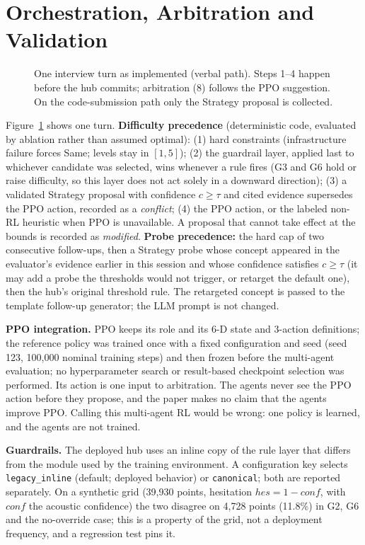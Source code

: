 \section{Orchestration, Arbitration and Validation}\label{sec:arbitration}
\begin{figure}[tbp]
\centering
\resizebox{0.68\textwidth}{!}{}
\caption{One interview turn as implemented (verbal path). Steps 1--4 happen before the hub commits; arbitration (8) follows the PPO suggestion. On the code-submission path only the Strategy proposal is collected.}\label{fig:flow}
\end{figure}
Figure~\ref{fig:flow} shows one turn. \textbf{Difficulty precedence} (deterministic code, evaluated by ablation rather than assumed optimal): (1) hard constraints (infrastructure failure forces Same; levels stay in $[1,5]$); (2) the guardrail layer, applied last to whichever candidate was selected, wins whenever a rule fires (G3 and G6 hold or raise difficulty, so this layer does not act solely in a downward direction); (3) a validated Strategy proposal with confidence $c \ge \tau$ and cited evidence supersedes the PPO action, recorded as a \emph{conflict}; (4) the PPO action, or the labeled non-RL heuristic when PPO is unavailable. A proposal that cannot take effect at the bounds is recorded as \emph{modified}. \textbf{Probe precedence:} the hard cap of two consecutive follow-ups, then a Strategy probe whose concept appeared in the evaluator's evidence earlier in this session and whose confidence satisfies $c \ge \tau$ (it may add a probe the thresholds would not trigger, or retarget the default one), then the hub's original threshold rule. The retargeted concept is passed to the template follow-up generator; the LLM prompt is not changed.

\textbf{PPO integration.} PPO keeps its role and its 6-D state and 3-action definitions; the reference policy was trained once with a fixed configuration and seed (seed 123, 100,000 nominal training steps) and then frozen before the multi-agent evaluation; no hyperparameter search or result-based checkpoint selection was performed. Its action is one input to arbitration. The agents never see the PPO action before they propose, and the paper makes no claim that the agents improve PPO. Calling this multi-agent RL would be wrong: one policy is learned, and the agents are not trained.

\textbf{Guardrails.} The deployed hub uses an inline copy of the rule layer that differs from the module used by the training environment. A configuration key selects \texttt{legacy\_inline} (default; deployed behavior) or \texttt{canonical}; both are reported separately. On a synthetic grid (39,930 points, hesitation $\mathit{hes}=1-\mathit{conf}$, with $\mathit{conf}$ the acoustic confidence) the two disagree on 4,728 points (11.8\%) in G2, G6 and the no-override case; this is a property of the grid, not a deployment frequency, and a regression test pins it.

